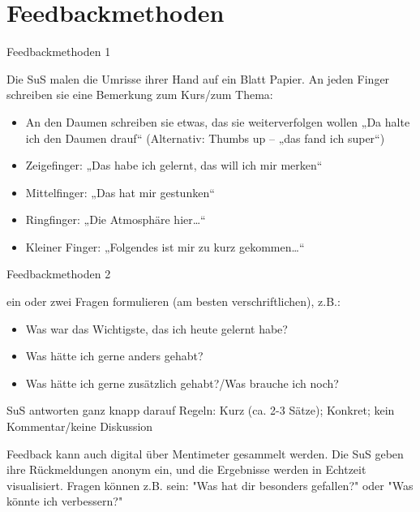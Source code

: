 \documentclass[aspectratio=\BeamerAspectRatio]{beamer}
\begin{document}
\section{Feedbackmethoden}
\begin{frame}{Feedbackmethoden 1}
\footnotesize
\begin{mynote}
Die SuS malen die Umrisse ihrer Hand auf ein Blatt Papier. An jeden Finger schreiben sie eine
Bemerkung zum Kurs/zum Thema:
\begin{itemize}
  \item An den Daumen schreiben sie etwas, das sie weiterverfolgen wollen „Da halte
ich den Daumen drauf“ (Alternativ: Thumbs up – „das fand ich super“)
\item Zeigefinger: „Das habe ich gelernt, das will ich mir merken“
\item Mittelfinger: „Das hat mir gestunken“
\item Ringfinger: „Die Atmosphäre hier…“
\item Kleiner Finger: „Folgendes ist mir zu kurz gekommen…“
\end{itemize}
\end{mynote}
\end{frame}

\begin{frame}{Feedbackmethoden 2}
  \footnotesize
\begin{mynote}[Blitzlicht]
ein oder zwei Fragen formulieren (am besten verschriftlichen), z.B.:
\begin{itemize}
\item Was war das Wichtigste, das ich heute gelernt habe?
\item Was hätte ich gerne anders gehabt?
\item Was hätte ich gerne zusätzlich gehabt?/Was brauche ich noch?
\end{itemize} 
SuS antworten ganz knapp darauf
Regeln: Kurz (ca. 2-3 Sätze); Konkret; kein Kommentar/keine Diskussion
\end{mynote}
\footnotesize
\begin{mynote}[Mentimeter]
Feedback kann auch digital über Mentimeter gesammelt werden. Die SuS geben ihre Rückmeldungen anonym ein, und die Ergebnisse werden in Echtzeit visualisiert. Fragen können z.B. sein: "Was hat dir besonders gefallen?" oder "Was könnte ich verbessern?"
\end{mynote}
\end{frame}
\end{document}
